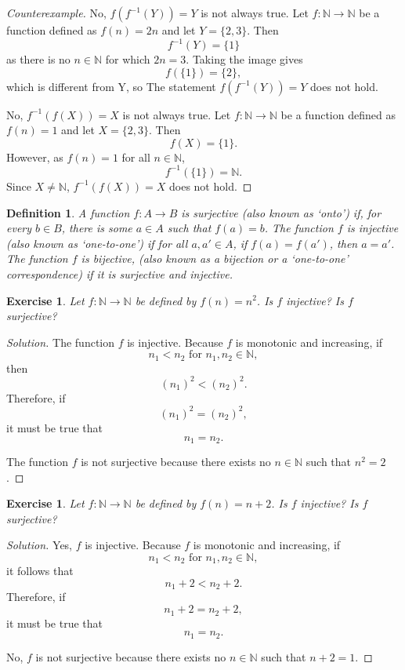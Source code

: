 \documentclass{amsart}
\newtheorem{definition}[theorem]{Definition}
\newtheorem{exercise}[theorem]{Exercise}
\newcommand{\N}{\mathbb N}
\newcommand{\1}{\mathds{1}}
\def \N {{\mathbb {N}}}
\numberwithin{equation}{section}
\numberwithin{theorem}{section}
\begin{document}
\begin{proof}[Counterexample]
	No, $f(f^{-1}(Y))=Y$ is not always true. Let $f:\N\to\N$ be a function defined as $f(n) = 2n$ and let $Y = \{2,3\}$. Then $$f^{-1}(Y) = \{1\}$$ as there is no $n\in\N$ for which $2n=3$. Taking the image gives $$f(\{1\}) = \{2\},$$ which is different from Y, so The statement $f(f^{-1}(Y))=Y$ does not hold. 
	
	No, $f^{-1}(f(X))=X$ is not always true. Let $f:\N\to\N$ be a function defined as $f(n) = 1$ and let $X = \{2,3\}$. Then $$f(X)=\{1\}.$$ However, as $f(n)=1$ for all $n\in\N$, $$f^{-1}(\{1\})= \N.$$ Since  $X\not=\N$, $f^{-1}(f(X))=X$ does not hold. 
	
\end{proof}

\begin{definition}  A function $f \colon A \rightarrow B$ is \emph{surjective} (also known as `onto') if, 
for every $b\in B$, there is some $a\in A$ such that $f(a) = b$.  The function $f$ is \emph{injective} (also known as `one-to-one') if for all $a, a' \in A$, if $f(a) = f(a')$, then $a = a'$.  The function $f$ is \emph{bijective}, (also known as a bijection or a `one-to-one' correspondence) if it is surjective and injective.
\end{definition}

\begin{exercise}
Let $f:{\mathbb N}\rightarrow {\mathbb N}$ be defined by $f(n)=n^2$.  Is $f$ injective?  Is $f$ surjective?

\end{exercise}

\begin{proof}[Solution]
	The function $f$ is injective. Because $f$ is monotonic and increasing, if $$n_1<n_2 \text{ for } n_1,n_2\in\N,$$ then $$(n_1)^2<(n_2)^2.$$ Therefore, if $$(n_1)^2=(n_2)^2,$$ it must be true that $$n_1=n_2.$$ 
	
	The function $f$ is not surjective because there exists no $n\in\N$ such that $n^2 = 2$.
\end{proof}

\begin{exercise}
Let $f:{\mathbb N}\rightarrow {\mathbb N}$ be defined by $f(n)=n+2$.  Is $f$ injective?  Is $f$ surjective?

\end{exercise}

\begin{proof}[Solution]
	Yes, $f$ is injective. Because $f$ is monotonic and increasing, if $$n_1<n_2 \text{ for } n_1,n_2\in\N,$$ it follows that $$n_1+2<n_2+2.$$ Therefore, if $$n_1+2=n_2+2,$$ it must be true that $$n_1=n_2.$$ 
	
	No, $f$ is not surjective because there exists no $n\in\N$ such that $n+2 = 1$.
\end{proof}
\end{document}
